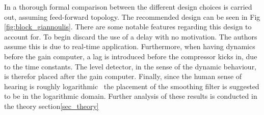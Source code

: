 \documentclass[../main2.tex]{subfiles}
\begin{document}
In \cite{reiss2012tutorial} a thorough formal comparison between the different design choices is carried out, assuming feed-forward topology. The recommended design can be seen in Fig \ref{fig:block_giannoulis}. There are some notable features regarding this design to account for. To begin \cite{reiss2012tutorial} discard the use of a delay with no motivation. The authors assume this is due to real-time application. Furthermore, when having dynamics before the gain computer, a lag is introduced before the compressor kicks in, due to the time constants. The level detector, in the sense of the dynamic behaviour, is therefor placed after the gain computer. Finally, since the human sense of hearing is roughly logarithmic~\cite{fastl2007psychoacoustics} the placement of the smoothing filter is suggested to be in the logarithmic domain. Further analysis of these results is conducted in the theory section\ref{sec_theory}
 
\end{document}
